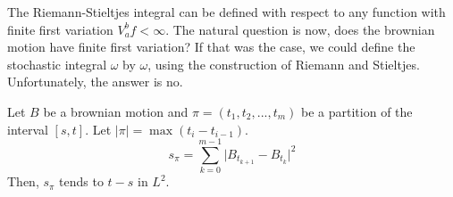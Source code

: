 The Riemann-Stieltjes integral can be defined with respect to any function with finite first variation $V_a^b f < \infty$. The natural question is now, does the brownian motion have finite first variation? If that was the case, we could define the stochastic integral $\omega$ by $\omega$, using the construction of Riemann and Stieltjes. Unfortunately, the answer is no. 

\begin{lemma}
    Let $B$ be a brownian motion and $\pi = (t_1,t_2,...,t_m)$ be a partition of the interval $[s,t]$. Let $\vert \pi \vert = \max (t_i-t_{i-1})$. 
    \begin{equation*}
        s_{\pi} = \sum_{k=0}^{m-1} \vert B_{t_{k+1}}-B_{t_k} \vert^2
    \end{equation*}
    Then, $s_{\pi}$ tends to $t-s$ in $L^2$. 
\end{lemma}
